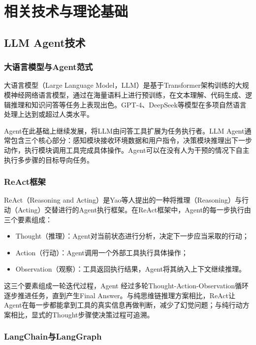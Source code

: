 
\chapter{相关技术与理论基础}

\section{LLM Agent技术}

\subsection{大语言模型与Agent范式}

大语言模型（Large Language Model，LLM）是基于Transformer架构\cite{Vaswani2017Attention}训练的大规模神经网络语言模型，通过在海量语料上进行预训练，在文本理解、代码生成、逻辑推理和知识问答等任务上表现出色。GPT-4\cite{OpenAI2024GPT4}、DeepSeek\cite{DeepSeekAI2024DeepSeekV3}等模型在多项自然语言处理上达到或超过人类水平。

Agent在此基础上继续发展，将LLM由问答工具扩展为任务执行者。LLM Agent通常包含三个核心部分：感知模块接收环境数据和用户指令，决策模块推理出下一步动作，执行模块调用工具完成具体操作。Agent可以在没有人为干预的情况下自主执行多步骤的目标导向任务。

\subsection{ReAct框架}

ReAct（Reasoning and Acting）\cite{Yao2022ReAct}是Yao等人提出的一种将推理（Reasoning）与行动（Acting）交替进行的Agent执行框架。在ReAct框架中，Agent的每一步执行由三个要素组成：

\begin{itemize}
  \item Thought（推理）：Agent对当前状态进行分析，决定下一步应当采取的行动；
  \item Action（行动）：Agent调用一个外部工具执行具体操作；
  \item Observation（观察）：工具返回执行结果，Agent将其纳入上下文继续推理。
\end{itemize}

这三个要素组成一轮迭代过程，Agent 经过多轮Thought-Action-Observation循环逐步推进任务，直到产生Final Answer。与纯思维链推理方案相比，ReAct让Agent在每一步都能拿到工具的真实信息再做判断，减少了幻觉问题；与纯行动方案相比，显式的Thought步骤使决策过程可追溯。

\subsection{LangChain与LangGraph}


